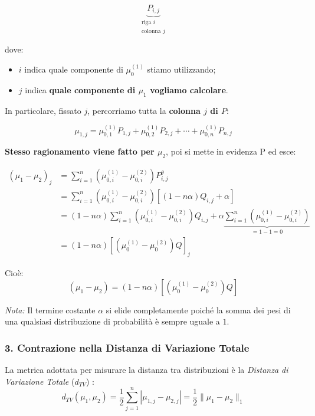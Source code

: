 $$
\underbrace{P_{i,j}}_{\substack{\text{riga }i\\\text{colonna }j}}
$$

dove:

\begin{itemize}
\item $i$ indica quale componente di $\mu_0^{(1)}$ stiamo utilizzando;
\item $j$ indica \textbf{quale componente di $\mu_1$ vogliamo calcolare}.
\end{itemize}

In particolare, fissato $j$, percorriamo tutta la \textbf{colonna $j$ di $P$}:

$$
\boxed{
\mu_{1,j}
=
\mu_{0,1}^{(1)}P_{1,j}
+
\mu_{0,2}^{(1)}P_{2,j}
+\cdots+
\mu_{0,n}^{(1)}P_{n,j}
}
$$

\textbf{Stesso ragionamento viene fatto per $\mu_2$}, poi si mette in evidenza P ed esce:

\begin{align*}
(\mu_1 - \mu_2)_j &= \sum_{i=1}^n \left( \mu_{0,i}^{(1)} - \mu_{0,i}^{(2)} \right) P^\theta_{i,j} \\
&= \sum_{i=1}^n \left( \mu_{0,i}^{(1)} - \mu_{0,i}^{(2)} \right) \left[ (1 - n\alpha) Q_{i,j} + \alpha \right] \\
&= (1 - n\alpha) \sum_{i=1}^n \left( \mu_{0,i}^{(1)} - \mu_{0,i}^{(2)} \right) Q_{i,j} + \alpha \underbrace{\sum_{i=1}^n \left( \mu_{0,i}^{(1)} - \mu_{0,i}^{(2)} \right)}_{= 1 - 1 = 0} \\
&= (1 - n\alpha) \left[ \left( \mu_0^{(1)} - \mu_0^{(2)} \right) Q \right]_j
\end{align*}

Cioè:
\begin{equation}
    (\mu_1 - \mu_2) = (1 - n\alpha) \left[ \left( \mu_0^{(1)} - \mu_0^{(2)} \right) Q \right]
\end{equation}

\textit{Nota:} Il termine costante $\alpha$ si elide completamente poiché la somma dei pesi di una qualsiasi distribuzione di probabilità è sempre uguale a $1$.

\subsubsection*{3. Contrazione nella Distanza di Variazione Totale}
La metrica adottata per misurare la distanza tra distribuzioni è la \textit{Distanza di Variazione Totale} ($d_{TV}$) :
\begin{equation}
d_{TV}(\mu_1, \mu_2) = \frac{1}{2} \sum_{j=1}^n |\mu_{1,j} - \mu_{2,j}| = \frac{1}{2} \|\mu_1 - \mu_2\|_1
\end{equation}

